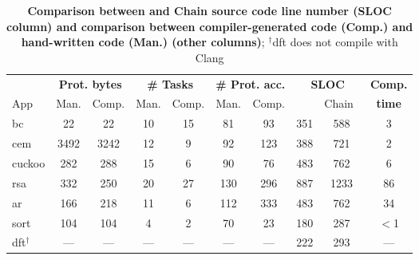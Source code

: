\begin{table}[t]
	\centering
	\footnotesize
	\renewcommand{\tabcolsep}{1pt}
	\begin{tabular}{|l|cc|cc|cc|cc|c|}
		\hline
		{} & \multicolumn{2}{c|}{{\bf Prot. bytes}} & \multicolumn{2}{c|}{{\bf \# Tasks}} & \multicolumn{2}{c|}{{\bf \# Prot. acc.}} & \multicolumn{2}{c|}{\bf SLOC} & {\bf Comp.} \\
		App & Man. & Comp. & Man. & Comp. & Man. & Comp. & \multicolumn{1}{l}{\sys} & \multicolumn{1}{r|}{Chain~\cite{chain}} & {\bf time} \\
		\hline\hline
		bc & 22 & 22 & 10 & 15 & 81 & 93 & 351 &588 & 3\\
		cem & 3492 & 3242 & 12 & 9 & 92 & 123 & 388 &721 & 2\\
		cuckoo & 282 & 288 & 15 & 6 & 90 & 76 & 483 &762 & 6\\
		rsa & 332 & 250 & 20 & 27 & 130 & 296 & 887 &1233 & 86\\
		ar & 166 & 218 & 11 & 6 & 112 & 333 & 483 &762 & 34\\
		sort & 104 & 104 & 4 & 2 & 70 & 23 & 180 & 287 & $<$1\\
		dft$^\dagger$ & --- & --- & --- & --- & --- & --- & 222 & 293 & ---\\
		\hline
	\end{tabular}
	\caption{\textbf{Comparison between \sys and Chain source code line number (SLOC column) and comparison between compiler-generated \sys code (Comp.) and hand-written \sys code (Man.) (other columns)}; $^\dagger$dft does not compile with Clang}\label{table:compiler_result}
\end{table}


